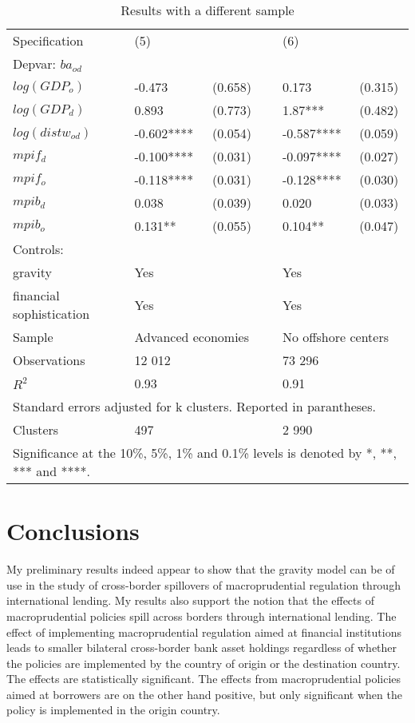 \documentclass[12pt,a4paper]{article}
\begin{document}
\begin{table}[!h]
\centering
\begin{tabular}{ l l l l l l}
\hline
Specification&(5)&&&(6)& \\
Depvar: $ba_{od}$&&&&&\\
\hline
$log(GDP_{o})$&-0.473&(0.658)&&0.173&(0.315)\\
$log(GDP_{d})$&0.893&(0.773)&&1.87***&(0.482)\\
$log(distw_{od})$&-0.602****&(0.054)&&-0.587****&(0.059)\\
$mpif_{d}$&-0.100****&(0.031)&&-0.097****&(0.027)\\
$mpif_{o}$&-0.118****&(0.031)&&-0.128****&(0.030)\\
$mpib_{d}$&0.038&(0.039)&&0.020&(0.033)\\
$mpib_{o}$&0.131**&(0.055)&&0.104**&(0.047)\\
Controls:&&&&&\\
gravity &Yes&&&Yes& \\ 
financial sophistication &Yes&&&Yes& \\
\hline
Sample &\multicolumn{2}{l}{Advanced economies}&&\multicolumn{2}{l}{No offshore centers} \\
Observations &12 012&&&73 296& \\
\hline
$R^2$&0.93&&&0.91&\\
\hline
\multicolumn{6}{l}{Standard errors adjusted for k clusters. Reported in parantheses. }\\
Clusters &497&&&2 990& \\
\hline
\multicolumn{6}{l}{\footnotesize Significance at the 10\%, 5\%, 1\% and 0.1\% levels is denoted by *, **, *** and ****.}\\
\end{tabular}
\caption{Results with a different sample}
\label{tab:robust2}
\end{table}


\cleardoublepage

\newpage
\section{Conclusions}

My preliminary results indeed appear to show that the gravity model can be of use in the study of cross-border spillovers of macroprudential regulation through international lending. My results also support the notion that the effects of macroprudential policies spill across borders through international lending.  The effect of implementing macroprudential regulation aimed at financial institutions leads to smaller bilateral cross-border bank asset holdings regardless of whether the policies are implemented by the country of origin or the destination country. The effects are statistically significant. The effects from macroprudential policies aimed at borrowers are on the other hand positive, but only significant when the policy is implemented in the origin country.
\end{document}

